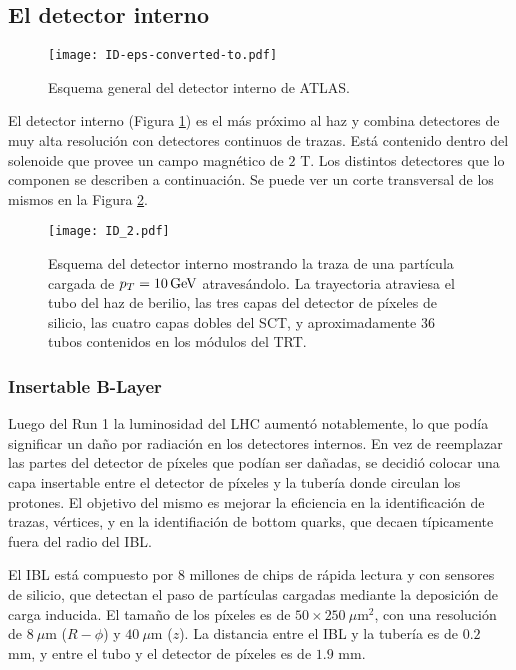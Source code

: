 \subsection{El detector interno}

\begin{figure}
\centering
\texttt{[image: ID-eps-converted-to.pdf]}
\caption{Esquema general del detector interno de ATLAS.}
\label{ID}
\end{figure}

El detector interno (Figura \ref{ID}) es el más próximo al haz y combina detectores de muy alta resolución con detectores continuos de trazas. Está contenido dentro del solenoide que provee un campo magnético de $2$ T. Los distintos detectores que lo componen se describen a continuación. Se puede ver un corte transversal de los mismos en la Figura \ref{ID_2}.

\begin{figure}
\centering
\texttt{[image: ID\_2.pdf]}
\caption{Esquema del detector interno mostrando la traza de una partícula cargada de $p_{T}=10 \, \mathrm{GeV}$ atravesándolo. La trayectoria atraviesa el tubo del haz de  berilio, las tres capas del detector de píxeles de silicio, las cuatro capas dobles del SCT, y aproximadamente 36 tubos contenidos en los módulos del TRT.}
\label{ID_2}
\end{figure}

\subsubsection{Insertable B-Layer}

Luego del Run 1 la luminosidad del LHC aumentó notablemente, lo que podía significar un daño por radiación en los detectores internos. En vez de reemplazar las partes del detector de píxeles que podían ser dañadas, se decidió colocar una capa insertable entre el detector de píxeles y la tubería donde circulan los protones. El objetivo del mismo es mejorar la eficiencia en la identificación de trazas, vértices, y en la identifiación de bottom quarks, que decaen típicamente fuera del radio del IBL.

El IBL está compuesto por $8$ millones de chips de rápida lectura y con sensores de silicio, que detectan el paso de partículas cargadas mediante la deposición de carga inducida. El tamaño de los píxeles es de $50\times250\:\mu$m$^{2}$, con una resolución de $8\:\mu$m ($R-\phi$) y $40\:\mu$m ($z$). La distancia entre el IBL y la tubería es de $0.2$ mm, y entre el tubo y el detector de píxeles es de $1.9$ mm. 

